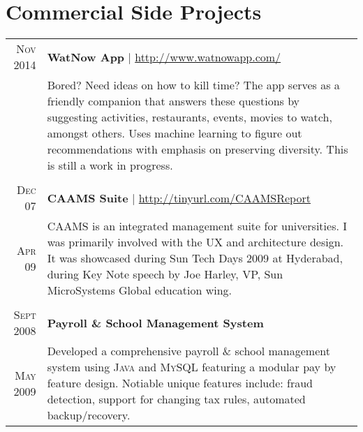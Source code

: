 \documentclass[a4paper,11pt]{article}
\begin{document}
\section{Commercial Side Projects}
\begin{longtable}{r|p{12.5cm}}
\textsc{Nov 2014} & \textbf{WatNow App} | \href{http://www.watnowapp.com/}{http://www.watnowapp.com/} \\
 & \footnotesize{ \begin{minipage}[t]{12.5cm} Bored? Need ideas on how to kill time? The app serves as a friendly companion that answers these questions by suggesting activities, restaurants, events, movies to watch, amongst others. Uses machine learning to figure out recommendations with emphasis on preserving diversity. This is still a work in progress. 
 \end{minipage}}
 \\
 \multicolumn{2}{c}{}
 \\
  \textsc{Dec 07} & \textbf{CAAMS Suite} | \href{http://tinyurl.com/CAAMSReport}{http://tinyurl.com/CAAMSReport}\\
 \textsc{Apr 09} & \footnotesize{ \begin{minipage}[t]{12.5cm}
 CAAMS is an integrated management suite for universities. I was primarily involved with the UX and architecture design. It was showcased during Sun Tech Days 2009 at Hyderabad, during Key Note speech by Joe Harley, VP, Sun MicroSystems Global education wing. 
 \end{minipage}}
 \\
 \multicolumn{2}{c}{}
 \\
 \textsc{Sept 2008} & \textbf{Payroll \& School Management System} \\
 \textsc{May 2009} & \footnotesize{ \begin{minipage}[t]{12.5cm} Developed a comprehensive payroll \& school management system using \textsc{Java} and \textsc{MySQL} featuring a modular pay by feature design. Notiable unique features include: fraud detection, support for changing tax rules, automated backup/recovery.
 \end{minipage}}\\
\end{longtable}
\end{document}
